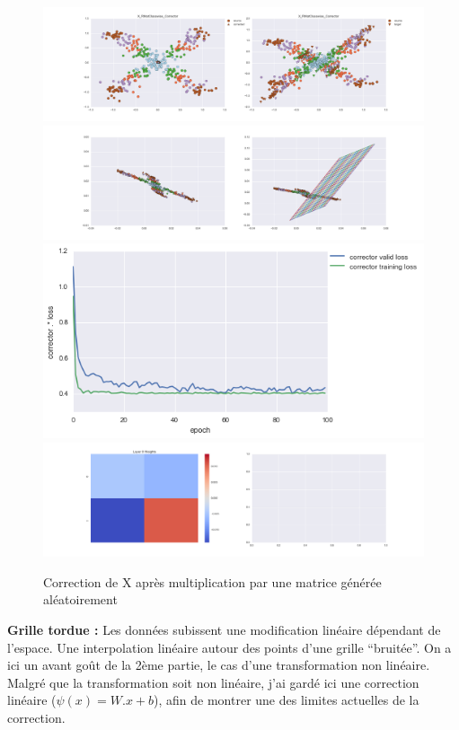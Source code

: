 \begin{figure}[H] %
\centering
\includegraphics[width=\linewidth]{fig/24-05-2016/X/X_RMatClasswise_Corrector-DATA.png}
\includegraphics[width=\linewidth]{fig/24-05-2016/X/X_RMatClasswise_Corrector-GridCheck.png}
\includegraphics[width=0.45\linewidth]{fig/24-05-2016/X/X_RMatClasswise_Corrector-Learning_curve.png}
\includegraphics[width=\linewidth]{fig/24-05-2016/X/X_RMatClasswise_Corrector-W.png}
\caption{Correction de X après multiplication par une matrice générée aléatoirement}
\label{fig:recap-X-RMat-classwise}
\end{figure}

{\Large \textbf{Grille tordue :}} Les données subissent une modification linéaire dépendant de l'espace.
Une interpolation linéaire autour des points d'une grille ``bruitée''.
On a ici un avant goût de la 2ème partie, le cas d'une transformation non linéaire.
Malgré que la transformation soit non linéaire, j'ai gardé ici une correction linéaire ($\psi(x) = W.x+b$),
afin de montrer une des limites actuelles de la correction.

